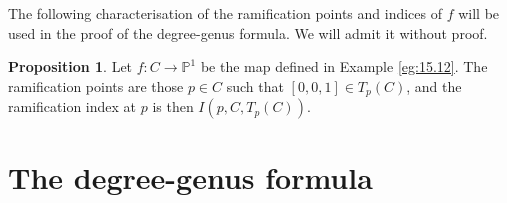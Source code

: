 \documentclass{article}
\renewcommand{\P}{\mathbb{P}}
\newcommand{\rb}[1]{\left( #1 \right)}
\renewcommand{\sb}[1]{\left[ #1 \right]}
\theoremstyle{definition}\newtheorem{definition}{Definition}[section]
\theoremstyle{definition}\newtheorem{notation}[definition]{Notation}
\theoremstyle{definition}\newtheorem{remark}[definition]{Remark}
\theoremstyle{definition}\newtheorem{example1}[definition]{Example}
\theoremstyle{definition}\newtheorem{fact}{Fact}
\theoremstyle{definition}\newtheorem{exercise}{Exercise}
\theoremstyle{definition}\newtheorem*{example2}{Example}
\newtheorem{proposition}[definition]{Proposition}
\begin{document}
The following characterisation of the ramification points and indices of $ f $ will be used in the proof of the degree-genus formula. We will admit it without proof.

\begin{proposition}
\label{prop:17.12}
Let $ f : C \to \P^1 $ be the map defined in Example \ref{eg:15.12}. The ramification points are those $ p \in C $ such that $ \sb{0, 0, 1} \in T_p\rb{C} $, and the ramification index at $ p $ is then $ I\rb{p, C, T_p\rb{C}} $.
\end{proposition}

\pagebreak

\section{The degree-genus formula}
\end{document}

